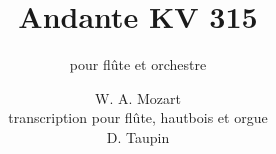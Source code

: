 \ifx\mxversion\undefined
  
  
  
\fi
\title{Andante KV 315}\subtitle{pour fl\^ute et orchestre}
\author{W. A. Mozart\\transcription pour fl\^ute, hautbois et orgue\\D. Taupin}
\maketitle

\parindent 2cm
\ifx\orgue\undefined\else{}\fi
\ifx\oboe\undefined\else{}\fi
\ifx\flute\undefined\else{}\fi
{}
\def\dble{\multnoteskip 2}

